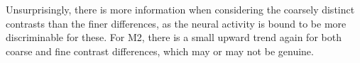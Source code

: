 Unsurprisingly, there is more information when considering the coarsely distinct contrasts than the finer differences, as the neural activity is bound to be more discriminable for these.
For \ac{M2}, there is a small upward trend again for both coarse and fine contrast differences, which may or may not be genuine.


